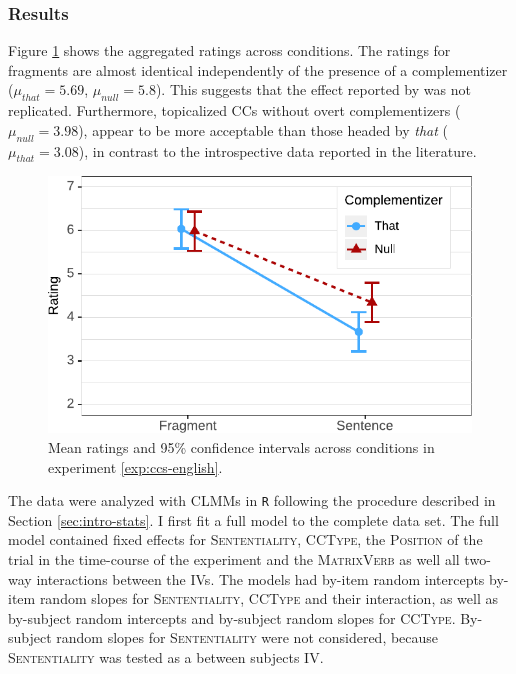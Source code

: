 \subsubsection{Results}\label{sec:ccs-english-results}

Figure \ref{fig:ccs-english-estimates} shows the aggregated ratings across conditions. The ratings for fragments are almost identical independently of the presence of a complementizer ($\mu_{that} = 5.69$, $\mu_{null} = 5.8$). This suggests that the effect reported by \citet{merchant.etal2013} was not replicated. Furthermore, topicalized CCs without overt complementizers ($\mu_{null} = 3.98$), appear to be more acceptable than those headed by \textit{that} ($\mu_{that} = 3.08$), in contrast to the introspective data reported in the literature.

\begin{figure}
\includegraphics[scale=1]{figures/ex2b_ccs_en_estimates}
 \caption{Mean ratings and 95\% confidence intervals across conditions in experiment \ref{exp:ccs-english}. \label{fig:ccs-english-estimates}}
\end{figure}

The data were analyzed with CLMMs in \texttt{R} following the procedure described in Section \ref{sec:intro-stats}. I first fit a full model to the complete data set. The full model contained fixed effects for \textsc{Sententiality}, \textsc{CCType}, the \textsc{Position} of the trial in the time-course of the experiment and the \textsc{MatrixVerb} as well all two-way interactions between the IVs. The models had by-item random intercepts by-item random slopes for \textsc{Sententiality}, \textsc{CCType} and their interaction, as well as by-subject random intercepts and by-subject random slopes for \textsc{CCType}. By-subject random slopes for \textsc{Sententiality} were not considered, because \textsc{Sententiality} was tested as a between subjects IV. 

